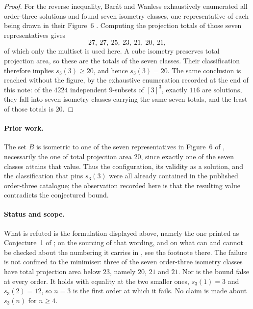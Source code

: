 \documentclass[11pt]{amsart}
\begin{document}
\begin{proof}
For the reverse inequality, Bar\'at and Wanless exhaustively enumerated all
order-three solutions and found seven isometry classes, one representative of
each being drawn in their Figure~6 \cite[Section~4, Table~1 and
Figure~6]{BW}. Computing the projection totals of those seven representatives
gives
\[
 27,\ 27,\ 25,\ 23,\ 21,\ 20,\ 21,
\]
of which only the multiset is used here. A cube isometry preserves total
projection area, so these are the totals of the seven classes. Their
classification therefore implies $s_3(3)\ge20$, and hence $s_3(3)=20$. The
same conclusion is reached without the figure, by the exhaustive enumeration
recorded at the end of this note: of the $4224$ independent $9$-subsets of
$[3]^3$, exactly $116$ are solutions, they fall into seven isometry classes
carrying the same seven totals, and the least of those totals is $20$.
\end{proof}

\paragraph{Prior work.}
The set $B$ is isometric to one of the seven representatives in Figure~6 of
\cite{BW}, necessarily the one of total projection area $20$, since exactly
one of the seven classes attains that value. Thus the configuration, its
validity as a solution, and the classification that pins $s_3(3)$ were all
already contained in the published order-three catalogue; the observation
recorded here is that the resulting value contradicts the conjectured bound.

\paragraph{Status and scope.}
What is refuted is the formulation displayed above, namely the one printed as
Conjecture~1 of \cite{BW}; on the sourcing of that wording, and on what can
and cannot be checked about the numbering it carries in \cite{BKV}, see the
footnote there. The failure is not confined to the minimiser: three of the
seven order-three isometry classes have total projection area below $23$,
namely $20$, $21$ and $21$. Nor is the bound false at every order. It holds
with equality at the two smaller ones, $s_3(1)=3$ and $s_3(2)=12$, so $n=3$
is the first order at which it fails. No claim is made about $s_3(n)$ for
$n\ge4$.
\end{document}

